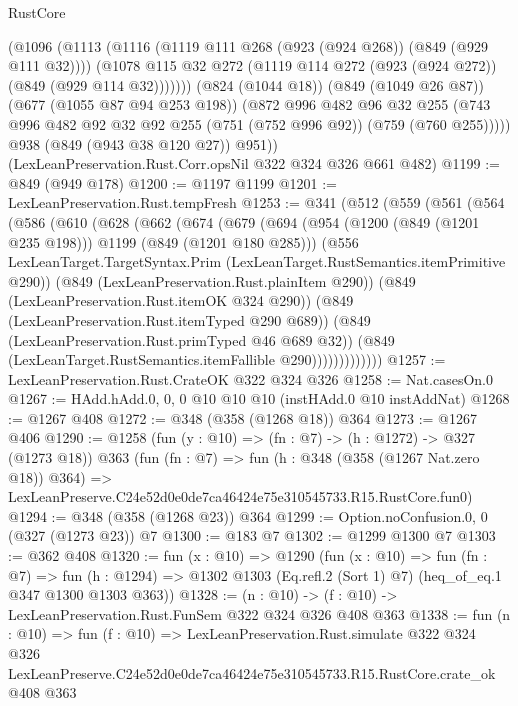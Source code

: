 \begin{lexlean}{RustCore}
\begin{coremodule}
            (@1096
              (@1113
                (@1116 (@1119 @111 @268 (@923 (@924 @268)) (@849 (@929 @111 @32))))
                (@1078 @115 @32 @272 (@1119 @114 @272 (@923 (@924 @272)) (@849 (@929 @114 @32)))))))
          (@824 (@1044 @18))
          (@849 (@1049 @26 @87))
          (@677 (@1055 @87 @94 @253 @198))
          (@872
            @996
            @482
            @96
            @32
            @255
            (@743 @996 @482 @92 @32 @92 @255 (@751 (@752 @996 @92)) (@759 (@760 @255)))))
        @938
        (@849 (@943 @38 @120 @27))
        @951))
    (LexLeanPreservation.Rust.Corr.opsNil @322 @324 @326 @661 @482)
@1199 := @849 (@949 @178)
@1200 := @1197 @1199
@1201 := LexLeanPreservation.Rust.tempFresh
@1253 := @341
    (@512
      (@559
        (@561
          (@564
            (@586
              (@610
                (@628
                  (@662
                    (@674
                      (@679
                        (@694
                          (@954 (@1200 (@849 (@1201 @235 @198))) @1199 (@849 (@1201 @180 @285)))
                          (@556
                            LexLeanTarget.TargetSyntax.Prim
                            (LexLeanTarget.RustSemantics.itemPrimitive @290))
                          (@849 (LexLeanPreservation.Rust.plainItem @290))
                          (@849 (LexLeanPreservation.Rust.itemOK @324 @290))
                          (@849 (LexLeanPreservation.Rust.itemTyped @290 @689))
                          (@849 (LexLeanPreservation.Rust.primTyped @46 @689 @32))
                          (@849 (LexLeanTarget.RustSemantics.itemFallible @290)))))))))))))
@1257 := LexLeanPreservation.Rust.CrateOK @322 @324 @326
@1258 := Nat.casesOn.{0}
@1267 := HAdd.hAdd.{0, 0, 0} @10 @10 @10 (instHAdd.{0} @10 instAddNat)
@1268 := @1267 @408
@1272 := @348 (@358 (@1268 @18)) @364
@1273 := @1267 @406
@1290 := @1258
    (fun (y : @10) => (fn : @7) -> (h : @1272) -> @327 (@1273 @18))
    @363
    (fun (fn : @7) =>
    fun (h : @348 (@358 (@1267 Nat.zero @18)) @364) =>
    LexLeanPreserve.C24e52d0e0de7ca46424e75e310545733.R15.RustCore.fun0)
@1294 := @348 (@358 (@1268 @23)) @364
@1299 := Option.noConfusion.{0, 0} (@327 (@1273 @23)) @7
@1300 := @183 @7
@1302 := @1299 @1300 @7
@1303 := @362 @408
@1320 := fun (x : @10) =>
  @1290
    (fun (x : @10) =>
    fun (fn : @7) =>
    fun (h : @1294) => @1302 @1303 (Eq.refl.{2} (Sort 1) @7) (heq_of_eq.{1} @347 @1300 @1303 @363))
@1328 := (n : @10) -> (f : @10) -> LexLeanPreservation.Rust.FunSem @322 @324 @326 @408 @363
@1338 := fun (n : @10) =>
  fun (f : @10) =>
  LexLeanPreservation.Rust.simulate
    @322
    @324
    @326
    LexLeanPreserve.C24e52d0e0de7ca46424e75e310545733.R15.RustCore.crate_ok
    @408
    @363
\end{coremodule}
\end{lexlean}
